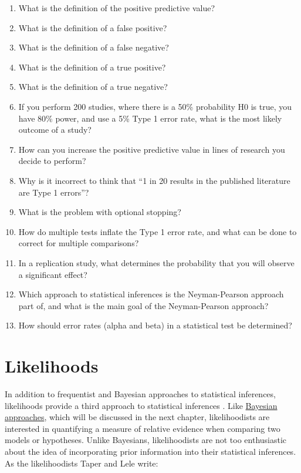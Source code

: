 \documentclass[
  oneside]{krantz}
\begin{document}
\begin{enumerate}
\def\labelenumi{\arabic{enumi}.}
\item
  What is the definition of the positive predictive value?
\item
  What is the definition of a false positive?
\item
  What is the definition of a false negative?
\item
  What is the definition of a true positive?
\item
  What is the definition of a true negative?
\item
  If you perform 200 studies, where there is a 50\% probability H0 is true, you have 80\% power, and use a 5\% Type 1 error rate, what is the most likely outcome of a study?
\item
  How can you increase the positive predictive value in lines of research you decide to perform?
\item
  Why is it incorrect to think that ``1 in 20 results in the published literature are Type 1 errors''?
\item
  What is the problem with optional stopping?
\item
  How do multiple tests inflate the Type 1 error rate, and what can be done to correct for multiple comparisons?
\item
  In a replication study, what determines the probability that you will observe a significant effect?
\item
  Which approach to statistical inferences is the Neyman-Pearson approach part of, and what is the main goal of the Neyman-Pearson approach?
\item
  How should error rates (alpha and beta) in a statistical test be determined?
\end{enumerate}

\hypertarget{likelihoods}{%
\chapter{Likelihoods}\label{likelihoods}}

In addition to frequentist and Bayesian approaches to statistical inferences, likelihoods provide a third approach to statistical inferences \citep{pawitan_all_2001, dienes_understanding_2008}. Like \href{bayes}{Bayesian approaches}, which will be discussed in the next chapter, likelihoodists are interested in quantifying a measure of relative evidence when comparing two models or hypotheses. Unlike Bayesians, likelihoodists are not too enthusiastic about the idea of incorporating prior information into their statistical inferences. As the likelihoodists Taper and Lele \citeyearpar{taper_philosophy_2011} write:
\end{document}
